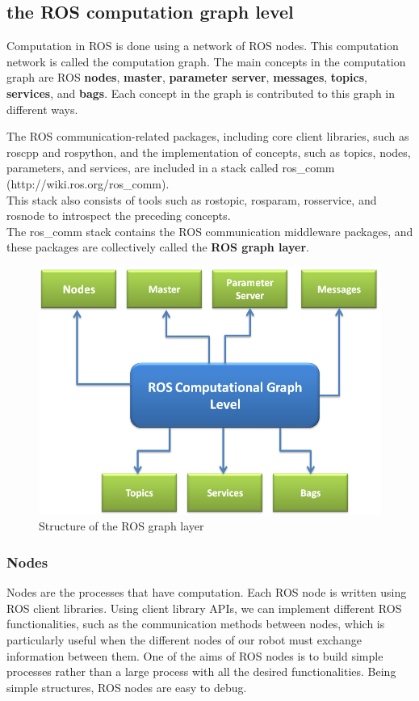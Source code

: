 \documentclass[../../main]{subfiles}
\begin{document}
\subsection{the ROS computation graph level}
Computation in ROS is done using a network of ROS nodes. This computation network is called the computation graph. The main concepts in the computation graph are ROS \textbf{nodes}, \textbf{master}, \textbf{parameter server}, \textbf{messages}, \textbf{topics}, \textbf{services}, and \textbf{bags}. Each concept in the graph is contributed to this graph in different ways.

The ROS communication-related packages, including core client libraries, such as roscpp and rospython, and the implementation of concepts, such as topics, nodes, parameters, and services, are included in a stack called ros\_comm (http://wiki.ros.org/ros\_comm).
\\
This stack also consists of tools such as rostopic, rosparam, rosservice, and rosnode to introspect the preceding concepts.
\\
The ros\_comm stack contains the ROS communication middleware packages, and these packages are collectively called the \textbf{ROS graph layer}.
\begin{figure}[ht]
    \centering
    \includegraphics{img/rosgraph.jpg}
    \caption{Structure of the ROS graph layer}
\end{figure}
\newpage
\subsubsection{Nodes}
Nodes are the processes that have computation. Each ROS node is written
using ROS client libraries. Using client library APIs, we can implement different
ROS functionalities, such as the communication methods between nodes, which
is particularly useful when the different nodes of our robot must exchange
information between them. One of the aims of ROS nodes is to build simple
processes rather than a large process with all the desired functionalities. Being
simple structures, ROS nodes are easy to debug.
\end{document}
